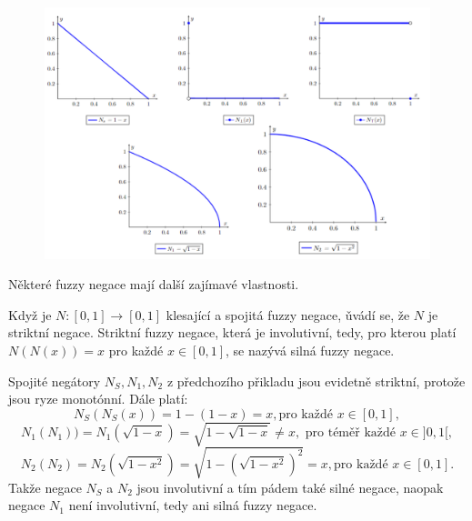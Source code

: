\begin{example}
\begin{graph}
            \begin{figure}[h]
                \includegraphics[scale=0.56]{template-fig/negace.pdf}
                \centering
            \end{figure}
        \end{graph}
    \end{example}

   N\v ekter\'e fuzzy negace maj\'i dal\v s\'i zaj\'imav\'e vlastnosti. 

    \begin{definition}
    \cite{Kolo}
        Kdy\v z je $N: [0,1] \to [0,1]$ klesající a spojitá fuzzy negace, \v uvádí se, \v ze $N$ je striktní negace.
        Striktn\'i fuzzy negace, kter\'a je involutivní, tedy, pro kterou plat\'i $N(N(x)) = x $ pro každé $ x \in [0,1]$, se nazývá silná fuzzy negace.
    \end{definition}

    \begin{example}
        Spojit\'e neg\'atory $N_S, N_1, N_2$ z p\v redchoz\'iho p\v rikladu jsou evidetn\v e striktn\'i, proto\v ze jsou ryze monot\'onn\'i. D\'ale plat\'i:
        $$N_S(N_S(x))=1-(1-x)=x, \mbox{pro ka\v zd\'e } x \in [0,1],$$
                $$N_1(N_1)) = N_1(\sqrt{1-x}) = \sqrt{1-\sqrt{1-x}} \neq x, \mbox{ pro t\'em\v e\v r každé } x \in ]0,1[,$$ $$N_2(N_2) = N_2(\sqrt{1-x^2}) = \sqrt{1-(\sqrt{1-x^2})^2} = x,
                \mbox{pro každé } x \in [0,1].$$
Takže negace $N_S$ a $N_2$ jsou involutivní a tím pádem tak\'e siln\'e negace, naopak
            negace $N_1$ není involutivní, tedy ani siln\'a fuzzy negace.
                
            \end{example}

